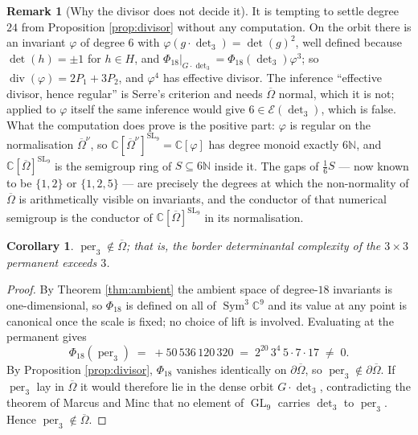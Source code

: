 \documentclass[11pt,reqno]{amsart}
\theoremstyle{plain}
\newtheorem{corollary}[theorem]{Corollary}
\theoremstyle{definition}
\newtheorem{remark}[theorem]{Remark}
\DeclareMathOperator{\GL}{GL}
\DeclareMathOperator{\SL}{SL}
\DeclareMathOperator{\Sym}{Sym}
\DeclareMathOperator{\per}{per}
\newcommand{\cO}{\overline{\Omega}}
\newcommand{\bC}{\mathbb{C}}
\newcommand{\bN}{\mathbb{N}}
\begin{document}
\begin{remark}[Why the divisor does not decide it]\label{rem:notdivisor}
It is tempting to settle degree $24$ from Proposition \ref{prop:divisor} without
any computation.  On the orbit there is an invariant $\varphi$ of degree $6$
with $\varphi(g\cdot\det_3)=\det(g)^{2}$, well defined because $\det(h)=\pm1$
for $h\in H$, and $\Phi_{18}|_{G\cdot\det_3}=\Phi_{18}(\det_3)\varphi^{3}$; so
$\operatorname{div}(\varphi)=2P_1+3P_2$, and $\varphi^{4}$ has effective
divisor.  The inference ``effective divisor, hence regular'' is Serre's
criterion and needs $\cO$ normal, which it is not; applied to $\varphi$ itself
the same inference would give $6\in\mathcal E(\det_3)$, which is false.  What
the computation does prove is the positive part: $\varphi$ is regular on the
normalisation $\cO^{\nu}$, so $\bC[\cO^{\nu}]^{\SL_9}=\bC[\varphi]$ has degree
monoid exactly $6\bN$, and $\bC[\cO]^{\SL_9}$ is the semigroup ring of
$S\subseteq6\bN$ inside it.  The gaps of $\tfrac16S$ --- now known to be
$\{1,2\}$ or $\{1,2,5\}$ --- are precisely the degrees at which the
non-normality of $\cO$ is arithmetically visible on invariants, and the
conductor of that numerical semigroup is the conductor of $\bC[\cO]^{\SL_9}$ in
its normalisation.
\end{remark}

\begin{corollary}\label{cor:perm}
$\per_3\notin\cO$; that is, the border determinantal complexity of the
$3\times3$ permanent exceeds $3$.
\end{corollary}

\begin{proof}
By Theorem \ref{thm:ambient} the ambient space of degree-$18$ invariants is
one-dimensional, so $\Phi_{18}$ is defined on all of $\Sym^{3}\bC^{9}$ and its
value at any point is canonical once the scale is fixed; no choice of lift is
involved.  Evaluating at the permanent gives
\begin{equation}\label{eq:perm}
  \Phi_{18}(\per_3)\;=\;+50\,536\,120\,320\;=\;2^{20}\,3^{4}\,5\cdot7\cdot17
  \;\neq\;0 .
\end{equation}
By Proposition \ref{prop:divisor}, $\Phi_{18}$ vanishes identically on
$\partial\cO$, so $\per_3\notin\partial\cO$.  If $\per_3$ lay in $\cO$ it would
therefore lie in the dense orbit $G\cdot\det_3$, contradicting the theorem of
Marcus and Minc \cite{MM} that no element of $\GL_9$ carries $\det_3$ to
$\per_3$.  Hence $\per_3\notin\cO$.
\end{proof}
\end{document}
